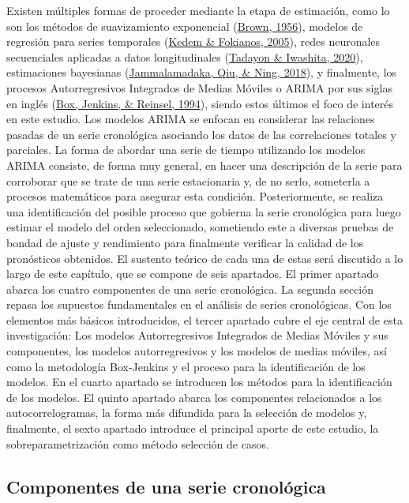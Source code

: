 \documentclass[
]{article}
\begin{document}
Existen múltiples formas de proceder mediante la etapa de estimación,
como lo son los métodos de suavizamiento exponencial
(\protect\hyperlink{ref-brown}{Brown, 1956}), modelos de regresión para
series temporales (\protect\hyperlink{ref-kedem}{Kedem \& Fokianos,
2005}), redes neuronales secuenciales aplicadas a datos longitudinales
(\protect\hyperlink{ref-redes}{Tadayon \& Iwashita, 2020}), estimaciones
bayesianas (\protect\hyperlink{ref-bayes}{Jammalamadaka, Qiu, \& Ning,
2018}), y finalmente, los procesos Autorregresivos Integrados de Medias
Móviles o ARIMA por sus siglas en inglés
(\protect\hyperlink{ref-box-jenkins}{Box, Jenkins, \& Reinsel, 1994}),
siendo estos últimos el foco de interés en este estudio. Los modelos
ARIMA se enfocan en considerar las relaciones pasadas de un serie
cronológica asociando los datos de las correlaciones totales y
parciales. La forma de abordar una serie de tiempo utilizando los
modelos ARIMA consiste, de forma muy general, en hacer una descripción
de la serie para corroborar que se trate de una serie estacionaria y, de
no serlo, someterla a procesos matemáticos para asegurar esta condición.
Posteriormente, se realiza una identificación del posible proceso que
gobierna la serie cronológica para luego estimar el modelo del orden
seleccionado, sometiendo este a diversas pruebas de bondad de ajuste y
rendimiento para finalmente verificar la calidad de los pronósticos
obtenidos. El sustento teórico de cada una de estas será discutido a lo
largo de este capítulo, que se compone de seis apartados. El primer
apartado abarca los cuatro componentes de una serie cronológica. La
segunda sección repasa los supuestos fundamentales en el análisis de
series cronológicas. Con los elementos más básicos introducidos, el
tercer apartado cubre el eje central de esta investigación: Los modelos
Autorregresivos Integrados de Medias Móviles y sus componentes, los
modelos autorregresivos y los modelos de medias móviles, así como la
metodología Box-Jenkins y el proceso para la identificación de los
modelos. En el cuarto apartado se introducen los métodos para la
identificación de los modelos. El quinto apartado abarca los componentes
relacionados a los autocorrelogramas, la forma más difundida para la
selección de modelos y, finalmente, el sexto apartado introduce el
principal aporte de este estudio, la sobreparametrización como método
selección de casos.

\subsection{Componentes de una serie cronológica}
\end{document}

